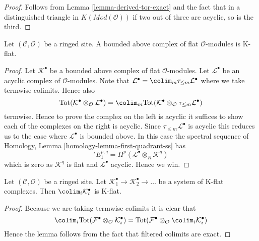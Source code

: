 \begin{proof}
Follows from
Lemma \ref{lemma-derived-tor-exact}
and the fact that in a distinguished triangle in
$K(\textit{Mod}(\mathcal{O}))$
if two out of three are acyclic, so is the third.
\end{proof}

\begin{lemma}
\label{lemma-bounded-flat-K-flat}
Let $(\mathcal{C}, \mathcal{O})$ be a ringed site. A bounded above complex
of flat $\mathcal{O}$-modules is K-flat.
\end{lemma}

\begin{proof}
Let $\mathcal{K}^\bullet$ be a bounded above complex of flat
$\mathcal{O}$-modules. Let $\mathcal{L}^\bullet$ be an acyclic complex
of $\mathcal{O}$-modules. Note that
$\mathcal{L}^\bullet = \colim_m \tau_{\leq m}\mathcal{L}^\bullet$
where we take termwise colimits. Hence also
$$
\text{Tot}(\mathcal{K}^\bullet \otimes_\mathcal{O} \mathcal{L}^\bullet)
=
\colim_m \text{Tot}(
\mathcal{K}^\bullet \otimes_\mathcal{O} \tau_{\leq m}\mathcal{L}^\bullet)
$$
termwise. Hence to prove the complex on the left is acyclic it suffices
to show each of the complexes on the right is acyclic. Since
$\tau_{\leq m}\mathcal{L}^\bullet$ is acyclic this reduces us to the
case where $\mathcal{L}^\bullet$ is bounded above.
In this case the spectral sequence of
Homology, Lemma \ref{homology-lemma-first-quadrant-ss}
has
$$
{}'E_1^{p, q} = H^p(\mathcal{L}^\bullet \otimes_R \mathcal{K}^q)
$$
which is zero as $\mathcal{K}^q$ is flat and $\mathcal{L}^\bullet$ acyclic.
Hence we win.
\end{proof}

\begin{lemma}
\label{lemma-colimit-K-flat}
Let $(\mathcal{C}, \mathcal{O})$ be a ringed site.
Let $\mathcal{K}_1^\bullet \to \mathcal{K}_2^\bullet \to \ldots$
be a system of K-flat complexes.
Then $\colim_i \mathcal{K}_i^\bullet$ is K-flat.
\end{lemma}

\begin{proof}
Because we are taking termwise colimits it is clear that
$$
\colim_i \text{Tot}(
\mathcal{F}^\bullet \otimes_\mathcal{O} \mathcal{K}_i^\bullet)
=
\text{Tot}(\mathcal{F}^\bullet \otimes_\mathcal{O}
\colim_i \mathcal{K}_i^\bullet)
$$
Hence the lemma follows from the fact that filtered colimits are
exact.
\end{proof}

